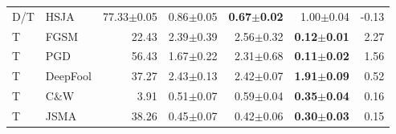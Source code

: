 \begin{tabular}{@{}llrrrrr@{}}
D/T & HSJA & 77.33$\pm$0.05 & 0.86$\pm$0.05 & \textbf{0.67$\pm$0.02} & 1.00$\pm$0.04 & -0.13\\
T & FGSM & 22.43 & 2.39$\pm$0.39 & 2.56$\pm$0.32 & \textbf{0.12$\pm$0.01} & 2.27\\
T & PGD & 56.43 & 1.67$\pm$0.22 & 2.31$\pm$0.68 & \textbf{0.11$\pm$0.02} & 1.56\\
T & DeepFool & 37.27 & 2.43$\pm$0.13 & 2.42$\pm$0.07 & \textbf{1.91$\pm$0.09} & 0.52\\
T & C\&W & 3.91 & 0.51$\pm$0.07 & 0.59$\pm$0.04 & \textbf{0.35$\pm$0.04} & 0.16\\
T & JSMA & 38.26 & 0.45$\pm$0.07 & 0.42$\pm$0.06 & \textbf{0.30$\pm$0.03} & 0.15\\
\bottomrule
\end{tabular}
